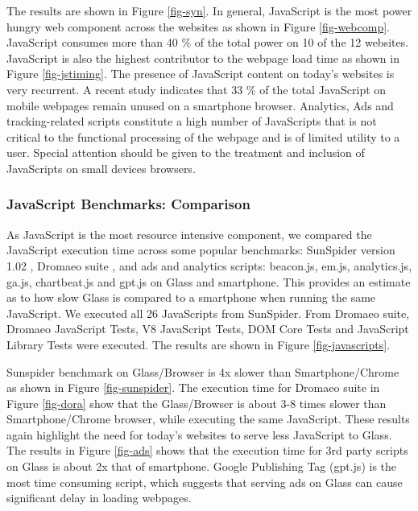 \documentclass{sig-alternate-10pt}
\begin{document}
The results  are shown in Figure \ref{fig-syn}.  In general, JavaScript is the most power hungry web component across  the websites as shown in  Figure \ref{fig-webcomp}. JavaScript  consumes more than 40 \% of the total power  on 10 of the 12 websites.   JavaScript is also the highest contributor to the webpage load time  as shown in Figure \ref{fig-jstiming}. The presence of JavaScript content on  today's websites is very recurrent.  A recent study \cite{Mendoza} indicates that 33 \% of the total JavaScript on mobile webpages remain unused on a smartphone  browser. Analytics, Ads and tracking-related scripts constitute a high number of JavaScripts that is not critical to the functional processing of the webpage and is of limited utility to a user. Special attention should be given to the treatment and inclusion of JavaScripts on  small devices browsers.

\subsubsection{JavaScript Benchmarks: Comparison}


As JavaScript is the most resource intensive component,  we   compared the JavaScript execution time across some popular benchmarks: SunSpider version 1.02 \cite{sun}, Dromaeo suite \cite{dromaeo}, and  ads and analytics scripts: beacon.js, em.js, analytics.js, ga.js, chartbeat.js and gpt.js   on Glass and smartphone. This provides an estimate as to how slow Glass is compared to  a smartphone when running the same JavaScript. We executed all 26 JavaScripts from SunSpider. From Dromaeo suite, Dromaeo JavaScript Tests, V8 JavaScript Tests, DOM Core Tests and JavaScript Library Tests were executed. The results are shown in Figure \ref{fig-javascripts}.
















  Sunspider benchmark on Glass/Browser is  4x slower than Smartphone/Chrome  as shown in Figure \ref{fig-sunspider}. The  execution time  for  Dromaeo  suite  in Figure \ref{fig-dora} show that the Glass/Browser is about 3-8 times  slower than Smartphone/Chrome browser,  while executing the same JavaScript. These results  again highlight the need for  today's websites to serve less JavaScript to Glass. The results    in Figure \ref{fig-ads} shows that the  execution time for 3rd party scripts on Glass is about 2x that of smartphone. Google Publishing Tag (gpt.js)  is the most time consuming script, which suggests that serving ads on Glass  can cause significant  delay in loading webpages. 
\end{document}

